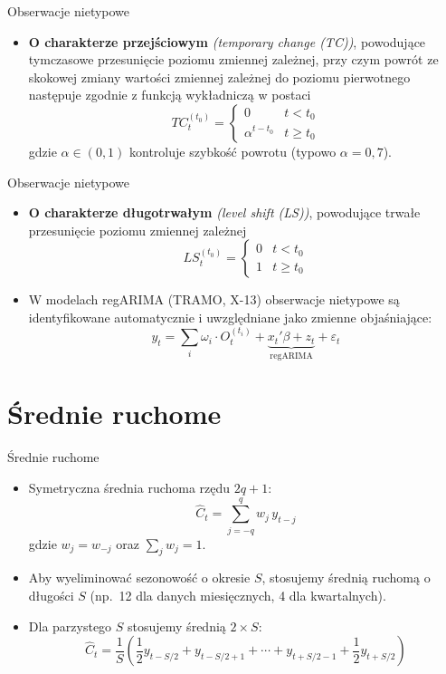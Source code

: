 \documentclass[11pt,usenames,dvipsnames,aspectratio=169]{beamer}
\begin{document}
\begin{frame}{Obserwacje nietypowe}
\begin{itemize}
    \item \textbf{O charakterze przejściowym} \emph{(temporary change (TC))}, powodujące tymczasowe przesunięcie poziomu zmiennej zależnej, przy czym powrót ze skokowej zmiany wartości zmiennej zależnej do poziomu pierwotnego następuje zgodnie z funkcją wykładniczą w postaci
    \[
    TC_{t}^{(t_{0})}=\begin{cases}
    0 & t<t_{0}\\
    \alpha^{t-t_{0}} & t\geq t_{0}
    \end{cases}
    \]
    gdzie $\alpha\in(0,1)$ kontroluje szybkość powrotu (typowo $\alpha=0{,}7$).
\end{itemize}
\end{frame}

\begin{frame}{Obserwacje nietypowe}
\begin{itemize}
    \item \textbf{O charakterze długotrwałym} \emph{(level shift (LS))}, powodujące trwałe przesunięcie poziomu zmiennej zależnej
    \[
    LS_{t}^{(t_{0})}=\begin{cases}
    0 & t<t_{0}\\
    1 & t\geq t_{0}
    \end{cases}
    \]
    \item W modelach regARIMA (TRAMO, X-13) obserwacje nietypowe są identyfikowane automatycznie i uwzględniane jako zmienne objaśniające:
    \[
    y_t = \sum_i \omega_i \cdot O_t^{(t_i)} + \underbrace{x_t'\beta + z_t}_{\text{regARIMA}} + \varepsilon_t
    \]
\end{itemize}
\end{frame}

\section{Średnie ruchome}

\begin{frame}{Średnie ruchome}
\begin{itemize}
    \item Symetryczna średnia ruchoma rzędu $2q+1$:
    \[
    \hat{C}_{t}=\sum_{j=-q}^{q}w_{j}\,y_{t-j}
    \]
    gdzie $w_{j}=w_{-j}$ oraz $\sum_{j}w_{j}=1$.
    \item Aby wyeliminować sezonowość o okresie $S$, stosujemy średnią ruchomą o długości $S$ (np.\ 12 dla danych miesięcznych, 4 dla kwartalnych).
    \item Dla parzystego $S$ stosujemy średnią $2\times S$:
    \[
    \hat{C}_{t}=\frac{1}{S}\!\left(\frac{1}{2}y_{t-S/2}+y_{t-S/2+1}+\cdots+y_{t+S/2-1}+\frac{1}{2}y_{t+S/2}\right)
    \]
\end{itemize}
\end{frame}
\end{document}
